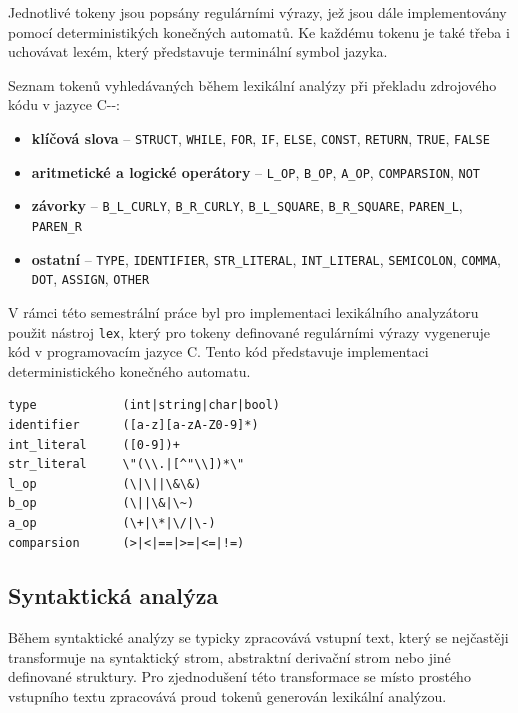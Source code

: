 \documentclass[12pt, a4paper]{article}
\begin{document}
Jednotlivé tokeny jsou popsány regulárními výrazy, jež jsou dále implementovány pomocí deterministikých konečných automatů. Ke každému tokenu je také třeba i uchovávat lexém, který představuje terminální symbol jazyka.

\newpage
Seznam tokenů vyhledávaných během lexikální analýzy při překladu zdrojového kódu v jazyce C-{}-:

\begin{itemize}
    \item \textbf{klíčová slova} -- \texttt{STRUCT}, \texttt{WHILE}, \texttt{FOR}, \texttt{IF}, \texttt{ELSE}, \texttt{CONST}, \texttt{RETURN}, \texttt{TRUE}, \texttt{FALSE}

    \item \textbf{aritmetické a logické operátory} -- \texttt{L\_OP}, \texttt{B\_OP}, \texttt{A\_OP}, \texttt{COMPARSION}, \texttt{NOT}
    \item \textbf{závorky} -- \texttt{B\_L\_CURLY}, \texttt{B\_R\_CURLY}, \texttt{B\_L\_SQUARE}, \texttt{B\_R\_SQUARE}, \texttt{PAREN\_L}, \texttt{PAREN\_R}
    \item \textbf{ostatní} -- \texttt{TYPE}, \texttt{IDENTIFIER}, \texttt{STR\_LITERAL}, \texttt{INT\_LITERAL}, \texttt{SEMICOLON}, \texttt{COMMA}, \texttt{DOT}, \texttt{ASSIGN}, \texttt{OTHER}


\end{itemize}

V rámci této semestrální práce byl pro implementaci lexikálního analyzátoru použit nástroj \texttt{lex}, který pro tokeny definované regulárními výrazy vygeneruje kód v programovacím jazyce C. Tento kód představuje implementaci deterministického konečného automatu.

\begin{lstlisting}[caption={Ukázka regulárních výrazů pro skenování tokenů}, captionpos=b, style=flex]
type            (int|string|char|bool)
identifier      ([a-z][a-zA-Z0-9]*)
int_literal     ([0-9])+
str_literal     \"(\\.|[^"\\])*\"
l_op            (\|\||\&\&)
b_op            (\||\&|\~)
a_op            (\+|\*|\/|\-)
comparsion      (>|<|==|>=|<=|!=)
\end{lstlisting}

\subsection{Syntaktická analýza}

Během syntaktické analýzy se typicky zpracovává vstupní text, který se nejčastěji transformuje na syntaktický strom, abstraktní derivační strom nebo jiné definované struktury. Pro zjednodušení této transformace se místo prostého vstupního textu zpracovává proud tokenů generován lexikální analýzou.
\end{document}
